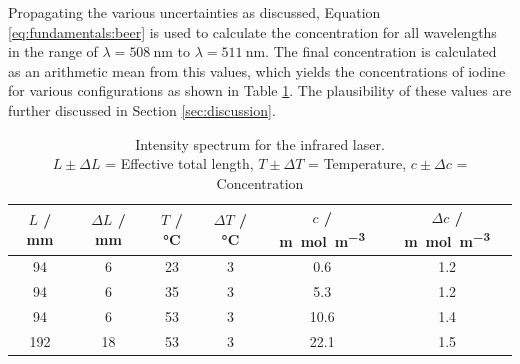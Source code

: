 Propagating the various uncertainties as discussed, Equation \ref{eq:fundamentals:beer} is used to calculate the concentration for all wavelengths in the range of $\lambda = \SI{508}{\nm}$ to $\lambda = \SI{511}{\nm}$. The final concentration is calculated as an arithmetic mean from this values, which yields the concentrations of iodine for various configurations as shown in Table \ref{tab:evaluation:concentration}. The plausibility of these values are further discussed in Section \ref{sec:discussion}.

\begin{table}[H]
    \centering
    \caption{Intensity spectrum for the infrared laser. \\
    $L \pm \Delta L$ = Effective total length, $T \pm \Delta T$ = Temperature, $c \pm \Delta c$ = Concentration}
    \label{tab:evaluation:concentration}
    \begin{tabular}{cccccc}
    \hline
    $L$ / mm & $\Delta L$ / mm & $T$ / \si{\celsius} & $\Delta T$ / \si{\celsius} & $c$ / \si{\m\mol\per\m^3} & $\Delta c$ / \si{\m\mol\per\m^3} \\ \hline
    94 & 6 & 23 & 3 & 0.6 & 1.2 \\
    94 & 6 & 35 & 3 & 5.3 & 1.2 \\
    94 & 6 & 53 & 3 & 10.6 & 1.4 \\
    192 & 18 & 53 & 3 & 22.1 & 1.5 \\ \hline
    \end{tabular}
\end{table}